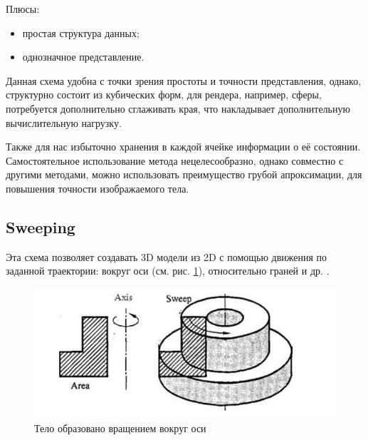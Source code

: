 Плюсы:
\begin{itemize}
  \item простая структура данных;
  \item однозначное представление.
\end{itemize}

Данная схема удобна с точки зрения простоты и точности представления, однако, структурно состоит из кубических форм,
для рендера, например, сферы, потребуется дополнительно сглаживать края, что накладывает дополнительную вычислительную нагрузку. 

Также для нас избыточно хранения в каждой ячейке информации о её состоянии.
Самостоятельное использование метода нецелесообразно, однако совместно с другими методами, можно использовать преимущество грубой апроксимации, для
повышения точности изображаемого тела. 
\subsection{Sweeping}
Эта схема позволяет создавать 3D модели из 2D с помощью движения по заданной траектории: вокруг оси (см. рис. \ref{fig:sweeping}), относительно граней и др. \cite{lecture_solid_modeling}.


\begin{figure}
  \centering
  \includegraphics[scale=0.6]{inc/img/sweeping}
  \caption{Тело образовано вращением вокруг оси}
  \label{fig:sweeping}
\end{figure}

